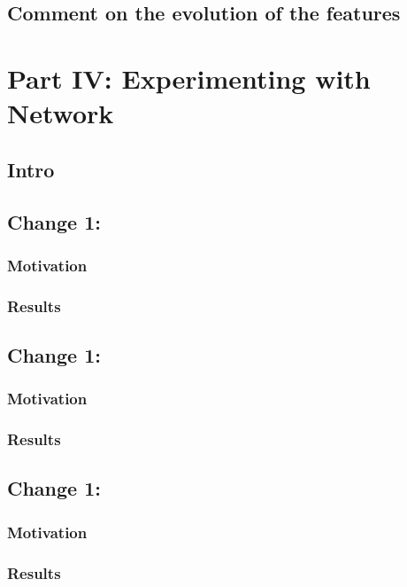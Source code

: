\documentclass{report}
\begin{document}
    \subsection{Comment on the evolution of the features}

    \section{Part IV: Experimenting with Network}

    \subsection{Intro}

    \subsection{Change 1: }

    \subsubsection{Motivation}

    \subsubsection{Results}

    \subsection{Change 1: }

    \subsubsection{Motivation}

    \subsubsection{Results}

    \subsection{Change 1: }

    \subsubsection{Motivation}

    \subsubsection{Results}
\end{document}
